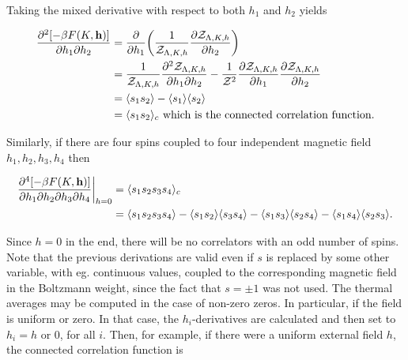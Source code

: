 \documentclass{homework}
\begin{document}
Taking the mixed derivative with respect to both $h_1$ and $h_2$ yields 

\begin{equation}
    \begin{split}
        \frac{\partial^2 [-\beta F(K,{\bf h})]}{\partial h_1 \partial h_2} &= \frac{\partial}{\partial h_1} \bigg(\frac{1}{\mathcal{Z}_{\Lambda, K, h}} \frac{\partial \mathcal{Z}_{\Lambda, K, h}}{\partial h_2} \bigg)  \\
        &= \frac{1}{\mathcal{Z}_{\Lambda, K, h}} \frac{\partial^2 \mathcal{Z}_{\Lambda, K, h}}{\partial h_1 \partial h_2} - \frac{1}{\mathcal{Z}^2} \frac{\partial \mathcal{Z}_{\Lambda, K, h}}{\partial h_1} \frac{\partial \mathcal{Z}_{\Lambda, K, h}}{\partial h_2} \\
        &= \langle s_1 s_2 \rangle - \langle s_1 \rangle \langle s_2 \rangle \\
        &= \langle s_1 s_2 \rangle_c \textnormal{ which is the connected correlation function.}
    \end{split}
\end{equation}

Similarly, if there are four spins coupled to four independent magnetic field $h_1, h_2, h_3, h_4$ then

\begin{equation}
    \begin{split}
        \frac{\partial^4 [-\beta F(K,{\bf h})]}{\partial h_1 \partial h_2 \partial h_3 \partial h_4}\bigg|_{h=0} &= \langle s_1 s_2 s_3 s_4 \rangle_c \\
        &= \langle s_1 s_2 s_3 s_4 \rangle - \langle s_1 s_2 \rangle \langle s_3 s_4 \rangle - \langle s_1 s_3 \rangle \langle s_2 s_4 \rangle - \langle s_1 s_4 \rangle \langle s_2 s_3 \rangle.
    \end{split}
\end{equation}

Since $h=0$ in the end, there will be no correlators with an odd number of spins. Note that the previous derivations are valid even if $s$ is replaced by some other variable, with eg. continuous values, coupled to the corresponding magnetic field in the Boltzmann weight, since the fact that $s = \pm 1$ was not used. The thermal averages may be computed in the case of non-zero zeros. In particular, if the field is uniform or zero. In that case, the $h_i$-derivatives are calculated and then set to $h_i = h$ or $0$, for all $i$. Then, for example, if there were a uniform external field $h$, the connected correlation function is 
\end{document}
